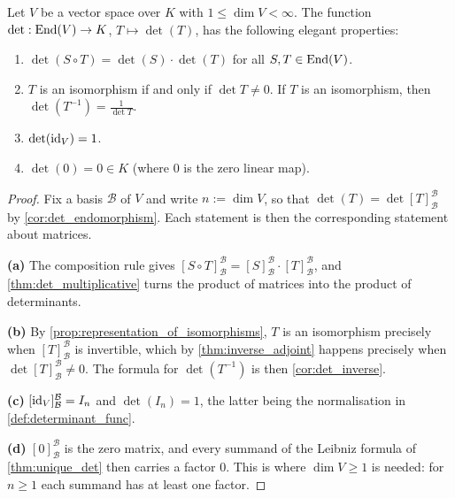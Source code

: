 \begin{proposition*}
\label{prop:det_endomorphism_properties}
Let $V$ be a vector space over $K$ with $1 \le \dim V < \infty$. The function $\det : \operatorname{End}(V) \to K$, $T \mapsto \det(T)$, has the following elegant properties:
\begin{enumerate}[label=\textbf{(\alph*)}]
  \item $\det(S \circ T) = \det(S) \cdot \det(T)$ for all $S, T \in \operatorname{End}(V)$.
  \item $T$ is an isomorphism if and only if $\det T \neq 0$. If $T$ is an isomorphism, then $\det(T^{-1}) = \frac{1}{\det T}$.
  \item $\det(\operatorname{id}_V) = 1$.
  \item $\det(0) = 0 \in K$ (where $0$ is the zero linear map).
\end{enumerate}
\end{proposition*}

\begin{proof}
Fix a basis $\mathcal{B}$ of $V$ and write $n := \dim V$, so that $\det(T) = \det [T]_{\mathcal{B}}^{\mathcal{B}}$ by \cref{cor:det_endomorphism}. Each statement is then the corresponding statement about matrices.

\textbf{(a)} The composition rule gives $[S \circ T]_{\mathcal{B}}^{\mathcal{B}} = [S]_{\mathcal{B}}^{\mathcal{B}} \cdot [T]_{\mathcal{B}}^{\mathcal{B}}$, and \cref{thm:det_multiplicative} turns the product of matrices into the product of determinants.

\textbf{(b)} By \cref{prop:representation_of_isomorphisms}, $T$ is an isomorphism precisely when $[T]_{\mathcal{B}}^{\mathcal{B}}$ is invertible, which by \cref{thm:inverse_adjoint} happens precisely when $\det [T]_{\mathcal{B}}^{\mathcal{B}} \neq 0$. The formula for $\det(T^{-1})$ is then \cref{cor:det_inverse}.

\textbf{(c)} $[\operatorname{id}_V]_{\mathcal{B}}^{\mathcal{B}} = I_n$ and $\det(I_n) = 1$, the latter being the normalisation in \cref{def:determinant_func}.

\textbf{(d)} $[0]_{\mathcal{B}}^{\mathcal{B}}$ is the zero matrix, and every summand of the Leibniz formula of \cref{thm:unique_det} then carries a factor $0$. This is where $\dim V \ge 1$ is needed: for $n \ge 1$ each summand has at least one factor. \qedhere
\end{proof}

